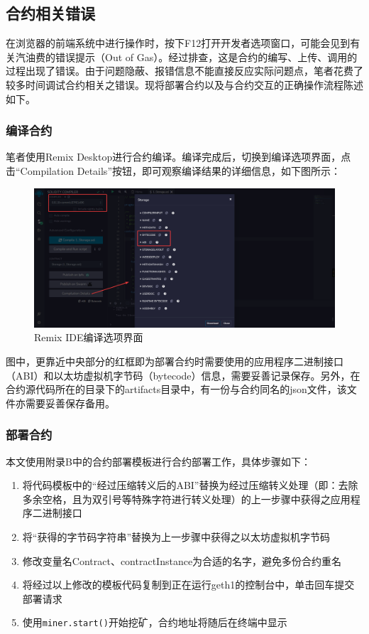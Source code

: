 \subsection{合约相关错误}

在浏览器的前端系统中进行操作时，按下F12打开开发者选项窗口，可能会见到有关汽油费的错误提示（Out of Gas）。经过排查，这是合约的编写、上传、调用的过程出现了错误。由于问题隐蔽、报错信息不能直接反应实际问题点，笔者花费了较多时间调试合约相关之错误。现将部署合约以及与合约交互的正确操作流程陈述如下。

\subsubsection{编译合约}

笔者使用Remix Desktop进行合约编译。编译完成后，切换到编译选项界面，点击“Compilation Details”按钮，即可观察编译结果的详细信息，如下图所示：

\begin{figure}[htbp]
    \centering
    \includegraphics[width=\textwidth]{images/remix.png}
    \caption{Remix IDE编译选项界面}\label{Remix IDE编译选项界面} %
\end{figure}

图中，更靠近中央部分的红框即为部署合约时需要使用的应用程序二进制接口（ABI）和以太坊虚拟机字节码（bytecode）信息，需要妥善记录保存。另外，在合约源代码所在的目录下的artifacts目录中，有一份与合约同名的json文件，该文件亦需要妥善保存备用。

\subsubsection{部署合约}

本文使用附录B中的合约部署模板进行合约部署工作，具体步骤如下：

\begin{enumerate}
    \item 将代码模板中的“经过压缩转义后的ABI”替换为经过压缩转义处理（即：去除多余空格，且为双引号等特殊字符进行转义处理）的上一步骤中获得之应用程序二进制接口
    \item 将“获得的字节码字符串”替换为上一步骤中获得之以太坊虚拟机字节码
    \item 修改变量名Contract、contractInstance为合适的名字，避免多份合约重名
    \item 将经过以上修改的模板代码复制到正在运行geth1的控制台中，单击回车提交部署请求
    \item 使用\verb|miner.start()|开始挖矿，合约地址将随后在终端中显示
\end{enumerate}

